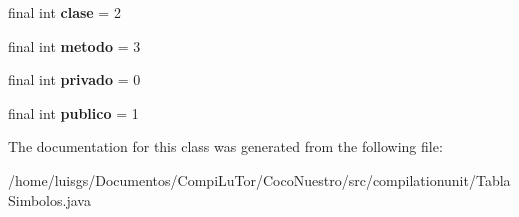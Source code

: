 \begin{DoxyCompactItemize}
\item 
\hypertarget{classcompilationunit_1_1_tabla_simbolos_af2b3d87aca2bd6d1905255bdaed58c91}{
final int {\bfseries clase} = 2}
\label{classcompilationunit_1_1_tabla_simbolos_af2b3d87aca2bd6d1905255bdaed58c91}

\item 
\hypertarget{classcompilationunit_1_1_tabla_simbolos_a8c2695e97fdf3764f485efdc959e7f4a}{
final int {\bfseries metodo} = 3}
\label{classcompilationunit_1_1_tabla_simbolos_a8c2695e97fdf3764f485efdc959e7f4a}

\item 
\hypertarget{classcompilationunit_1_1_tabla_simbolos_a12ba02df164c0bdc6cf7771036b10355}{
final int {\bfseries privado} = 0}
\label{classcompilationunit_1_1_tabla_simbolos_a12ba02df164c0bdc6cf7771036b10355}

\item 
\hypertarget{classcompilationunit_1_1_tabla_simbolos_a972ec906e4be8918f1cf8dd103a19637}{
final int {\bfseries publico} = 1}
\label{classcompilationunit_1_1_tabla_simbolos_a972ec906e4be8918f1cf8dd103a19637}

\end{DoxyCompactItemize}


The documentation for this class was generated from the following file:\begin{DoxyCompactItemize}
\item 
/home/luisgs/Documentos/CompiLuTor/CocoNuestro/src/compilationunit/TablaSimbolos.java\end{DoxyCompactItemize}
